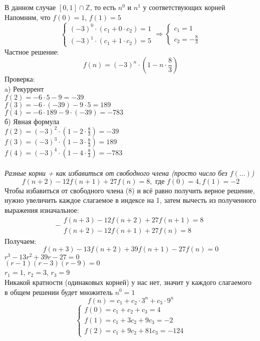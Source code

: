 \documentclass[12pt]{article}
\begin{document}
В данном случае $[0, 1] \cap \mathbb{Z}$, то есть $n^0$ и $n^1$ у соответствующих корней\\
Напомним, что $f(0) = 1$, $f(1) = 5$\\
\[
 \begin{cases}
   (-3)^0 \cdot (c_1 + 0 \cdot c_2) = 1
   \\
   (-3)^1 \cdot (c_1 + 1 \cdot c_2) = 5
 \end{cases} 
 \Rightarrow
 \begin{cases}
    c_1 = 1\\
    c_2 = -\frac{8}{3}
 \end{cases} 
\]
Частное решение:
\[
f(n) = (-3)^n \cdot (1 - n \cdot \frac{8}{3})
\]
Проверка:\\
a) Рекуррент\\
$f(2) = -6 \cdot 5 - 9 = -39$\\
$f(3) = -6 \cdot (-39) - 9 \cdot 5 = 189$\\
$f(4) = -6 \cdot 189 - 9 \cdot (-39) = -783$\\
б) Явная формула\\
$f(2) = (-3)^2 \cdot (1 - 2 \cdot \frac{8}{3}) = -39$\\
$f(3) = (-3)^3 \cdot (1 - 3 \cdot \frac{8}{3}) = 189$\\
$f(4) = (-3)^4 \cdot (1 - 4 \cdot \frac{8}{3}) = -783$\\
\\
\textit{Разные корни + как избавиться от свободного члена (просто число без $f(...)$)}
\[
f(n+2) - 12f(n+1) + 27f(n) = 8,\text{ где } f(0) = 4, f(1) = -2
\]
Чтобы избавиться от свободного члена (8) и всё равно получить верное решение, нужно увеличить каждое слагаемое в индексе на 1, затем вычесть из полученного выражения изначальное:\\
\[
-
 \begin{array}{c}
   f(n+3) - 12f(n+2) + 27f(n+1) = 8
   \\
   f(n+2) - 12f(n+1) + 27f(n) = 8
 \end{array}
\]
Получаем:
\[
    f(n+3) - 13f(n+2) + 39f(n+1) - 27f(n) = 0
\]
$r^3 - 13r^2 + 39r - 27 = 0$\\
$(r - 1)(r - 3)(r - 9) = 0$\\
$r_1 = 1$, $r_2 = 3$, $r_3 = 9$\\
Никакой кратности (одинаковых корней) у нас нет, значит у каждого слагаемого в общем решении будет множитель $n^0 = 1$\\
\[
    f(n) = c_1 + c_2 \cdot 3^n + c_3 \cdot 9^n
\]
\[
 \begin{cases}
   f(0) = c_1 + c_2 + c_3 = 4\\
   f(1) = c_1 + 3c_2  + 9c_3 = -2\\
   f(2) = c_1 + 9c_2 + 81c_3 = -124
 \end{cases}
\]
\end{document}
